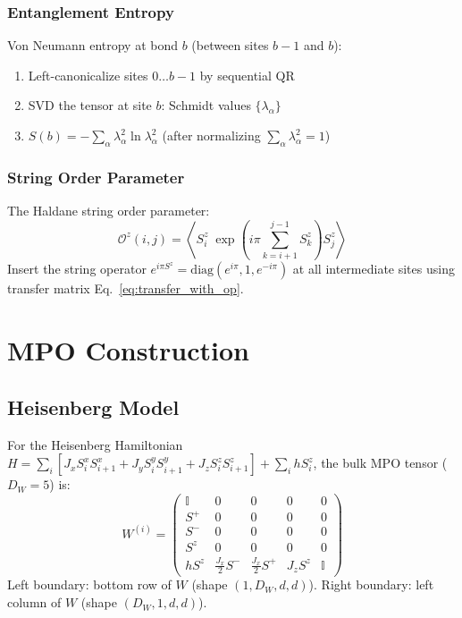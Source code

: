 \documentclass[aps,prb,onecolumn,scriptaddress]{revtex4-2}
\newcommand{\Id}{\mathbb{I}}
\begin{document}
	\subsubsection{Entanglement Entropy}
	
	Von Neumann entropy at bond $b$ (between sites $b-1$ and $b$):
	\begin{enumerate}
		\item Left-canonicalize sites $0 \dots b-1$ by sequential QR
		\item SVD the tensor at site $b$: Schmidt values $\{\lambda_\alpha\}$
		\item $S(b) = -\sum_\alpha \lambda_\alpha^2 \ln \lambda_\alpha^2$
		(after normalizing $\sum_\alpha\lambda_\alpha^2 = 1$)
	\end{enumerate}
	
	\subsubsection{String Order Parameter}
	
	The Haldane string order parameter:
	\begin{equation}
		\mathcal{O}^z(i,j) = \left\langle S^z_i\;
		\exp\!\left(i\pi \sum_{k=i+1}^{j-1} S^z_k\right)
		S^z_j \right\rangle
	\end{equation}
	Insert the string operator $e^{i\pi S^z} = \mathrm{diag}(e^{i\pi}, 1, e^{-i\pi})$
	at all intermediate sites using transfer matrix Eq.~\eqref{eq:transfer_with_op}.
	
	\clearpage
	\section{MPO Construction}
	
	\subsection{Heisenberg Model}
	
	For the Heisenberg Hamiltonian
	$H = \sum_{i} [J_x S^x_i S^x_{i+1} + J_y S^y_i S^y_{i+1}
	+ J_z S^z_i S^z_{i+1}] + \sum_i h S^z_i$,
	the bulk MPO tensor ($D_W = 5$) is:
	\begin{equation}
		W^{(i)} = \begin{pmatrix}
			\Id & 0 & 0 & 0 & 0 \\
			S^+ & 0 & 0 & 0 & 0 \\
			S^- & 0 & 0 & 0 & 0 \\
			S^z & 0 & 0 & 0 & 0 \\
			hS^z & \tfrac{J_x}{2}S^- & \tfrac{J_x}{2}S^+ & J_z S^z & \Id
		\end{pmatrix}
	\end{equation}
	Left boundary: bottom row of $W$ (shape $(1, D_W, d, d)$).
	Right boundary: left column of $W$ (shape $(D_W, 1, d, d)$).
	
\end{document}
